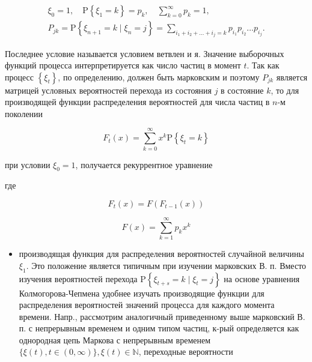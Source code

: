 \documentclass[10pt]{article}
\begin{document}
\[

\begin{gathered}

\xi_{0}=1, \quad \mathrm{P}\left\{\xi_{1}=k\right\}=p_{k}, \quad \sum_{k=0}^{\infty} p_{k}=1, \\

P_{j k}=\mathrm{P}\left\{\xi_{n+1}=k \mid \xi_{n}=j\right\}=\sum_{i_{1}+i_{2}+\ldots+i_{j}=k} p_{i_{1}} p_{i_{2}} \ldots p_{i_{j}} .

\end{gathered}

\]



Последнее условие называется условием ветвлен и я. Значение выборочных функций процесса интерпретируется как число частиц в момент $t$. Так как процесс $\left\{\xi_{t}\right\}$, по определению, должен быть марковским и поэтому $P_{j k}$ является матрицей условных вероятностей перехода из состояния $j$ в состояние $k$, то для производящей функции распределения вероятностей для числа частиц в $n$-м поколении



\[

F_{t}(x)=\sum_{k=0}^{\infty} x^{k} \mathrm{P}\left\{\xi_{t}=k\right\}

\]



при условии $\xi_{0}=1$, получается рекуррентное уравнение



где



\[

F_{t}(x)=F\left(F_{t-1}(x)\right)

\]



\[

F(x)=\sum_{k=1}^{\infty} p_{k} x^{k}

\]



\begin{itemize}

  \item производящая функция для распределения вероятностей случайной величины $\xi_{1}$. Это положение является типичным при изучении марковских В. п. Вместо изучения вероятностей перехода $\mathrm{P}\left\{\xi_{t+s}=k \mid \xi_{t}=j\right\}$ на основе уравнения Колмогорова-Чепмена удобнее изучать производящие функции для распределения вероятностей значений процесса для каждого момента времени. Напр., рассмотрим аналогичный приведенному выше марковский В. п. с непрерывным временем и одним типом частиц, к-рый определяется как однородная цепь Маркова с непрерывным временем $\{\xi(t), t \in(0, \infty)\}, \xi(t) \in \mathbb{N}$, переходные вероятности

\end{itemize}
\end{document}
